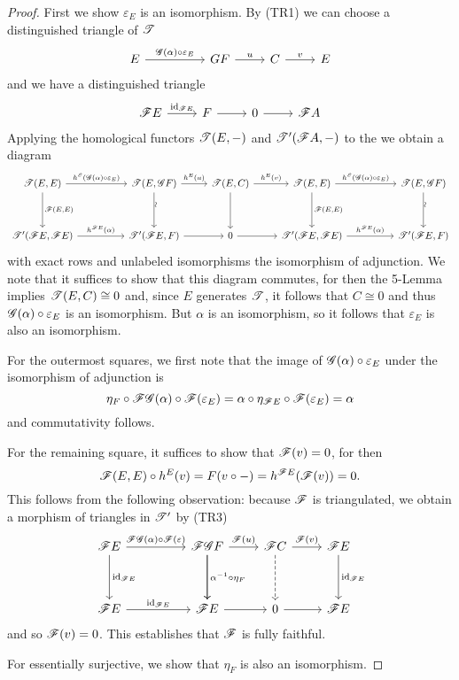 \documentclass[dissertation.tex]{subfiles}
\begin{document}
\begin{cor}
\begin{proof}
    First we show $\varepsilon_E$ is an isomorphism.
    By (TR1) we can choose a distinguished triangle of $\mathscr{T}$
    $$\begin{tikzcd}
      E \arrow{rr}{\G(\alpha) \circ \varepsilon_E} && GF \arrow{r}{u} & C \arrow{r}{v} & E
    \end{tikzcd}$$
    and we have a distinguished triangle
    $$\begin{tikzcd}
      \F E \arrow{r}{\id_{\F E}} & F \arrow{r} & 0 \arrow{r} & \F A
    \end{tikzcd}$$
    Applying the homological functors $\mathscr{T}(E, -)$ and $\mathscr{T}^\prime(\mathscr{F} A, - )$ to the we obtain a diagram
    $$\begin{tikzcd}
      \T(E,E) \arrow{rr}{h^{\E}(\G(\alpha) \circ \varepsilon_E)}\arrow{dd}{\F(E,E)} && \T(E,\G F) \arrow{r}{h^E(u)}\arrow{dd}[rotate=90,yshift=-.5ex]{\sim} & \T(E,C) \arrow{r}{h^E(v)}\arrow{dd} & \T(E,E) \arrow{rr}{h^{\E}(\G(\alpha) \circ \varepsilon_E)}\arrow{dd}{\F(E,E)} && \T(E, \G F)\arrow{dd}[rotate=90,yshift=-.5ex]{\sim}\\
      \\
      \T^\prime(\F E, \F E) \arrow{rr}{h^{\F E}(\alpha)} && \T^\prime(\F E, F) \arrow{r} & 0 \arrow{r} & \T^\prime(\F E, \F E) \arrow{rr}{h^{\F E}(\alpha)} && \T^\prime(\F E, F)
    \end{tikzcd}$$
    with exact rows and unlabeled isomorphisms the isomorphism of adjunction.
    We note that it suffices to show that this diagram commutes, for then the 5-Lemma implies $\mathscr{T}(E,C) \cong 0$ and, since $E$ generates $\mathscr{T}$, it follows that $C \cong 0$ and thus $\mathscr{G}(\alpha) \circ \varepsilon_E$ is an isomorphism.
    But $\alpha$ is an isomorphism, so it follows that $\varepsilon_E$ is also an isomorphism.

    For the outermost squares, we first note that the image of $\mathscr{G}(\alpha) \circ \varepsilon_E$ under the isomorphism of adjunction is
    $$\eta_F \circ \mathscr{F}\mathscr{G}(\alpha) \circ \mathscr{F}(\varepsilon_E) = \alpha \circ \eta_{\mathscr{F} E} \circ \mathscr{F}(\varepsilon_E) = \alpha$$
    and commutativity follows.

    For the remaining square, it suffices to show that $\mathscr{F}(v) = 0$, for then
    $$\mathscr{F}(E,E) \circ h^E(v) = F(v \circ -) = h^{\mathscr{F} E}(\mathscr{F}(v)) = 0.$$
    This follows from the following observation: because $\mathscr{F}$ is triangulated, we obtain a morphism of triangles in $\mathscr{T}^\prime$ by (TR3)
    $$\begin{tikzcd}
      \F E \arrow{rr}{\F\G(\alpha) \circ \F(\varepsilon)} \arrow{dd}{\id_{\F E}} &&
      \F\G F \arrow{dd} \arrow{r}{\F(u)}\arrow{dd}{\alpha^{-1} \circ \eta_{F}} &
      \F C \arrow{r}{\F(v)} \arrow[dashed]{dd} &
      \F E \arrow{dd}{\id_{\F E}}\\\\
      \F E \arrow{rr}{\id_{\F E}} && \F E \arrow{r} & 0 \arrow{r} & \F E
    \end{tikzcd}$$
    and so $\mathscr{F}(v) = 0$.
    This establishes that $\mathscr{F}$ is fully faithful.

    For essentially surjective, we show that $\eta_F$ is also an isomorphism.
  \end{proof}
\end{cor}
\end{document}
